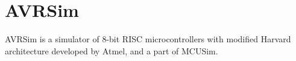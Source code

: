 \chapter{AVRSim} \label{chapter:avrsim}

AVRSim is a simulator of 8-bit RISC microcontrollers with modified
Harvard architecture developed by Atmel, and a part of MCUSim.
